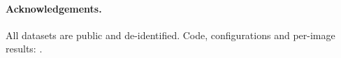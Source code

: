 \paragraph{Acknowledgements.}  All datasets are public and de-identified. Code, configurations and per-image results: .
